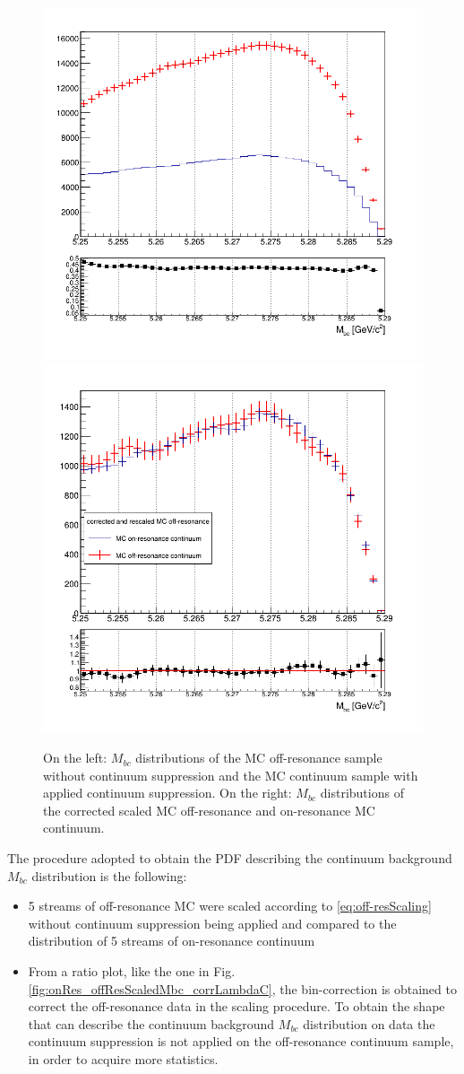 \begin{figure}
\centering
\subcaptionbox{\label{fig:onRes_offResScaledMbc_corrLambdaC}}
{\includegraphics[width=.46\textwidth]{04-chargedCorrBtoLambda/figs/stream01235_charged_corrLambdaC_woCScuts_Mbc_scaling.png}} \quad
\subcaptionbox{\label{fig:Mbc_scaled_bin_correctedOffResContinuum}}
{\includegraphics[width=.44\textwidth]{04-chargedCorrBtoLambda/figs/MC_on_off_resonance_stream4_continuum_2D_Mbc_corrected.png}} \quad
\caption{On the left: $M_{bc}$ distributions of the MC off-resonance sample without continuum suppression and the MC continuum sample with applied continuum suppression. On the right: $M_{bc}$ distributions of the corrected scaled MC off-resonance and on-resonance MC continuum.}
\end{figure}


The procedure adopted to obtain the PDF describing the continuum background  $M_{bc}$ distribution is the following:
\begin{itemize}

\item 5 streams of off-resonance MC were scaled according to \cref{eq:off-resScaling} without continuum suppression being applied and compared to the distribution of 5 streams of on-resonance continuum
\item From a ratio plot, like the one in Fig. \ref{fig:onRes_offResScaledMbc_corrLambdaC}, the bin-correction is obtained to correct the off-resonance data in the scaling procedure.
To obtain the shape that can describe the continuum background  $M_{bc}$ distribution on data the continuum suppression is not applied on the off-resonance continuum sample, in order to acquire more statistics. 
\end{itemize}

